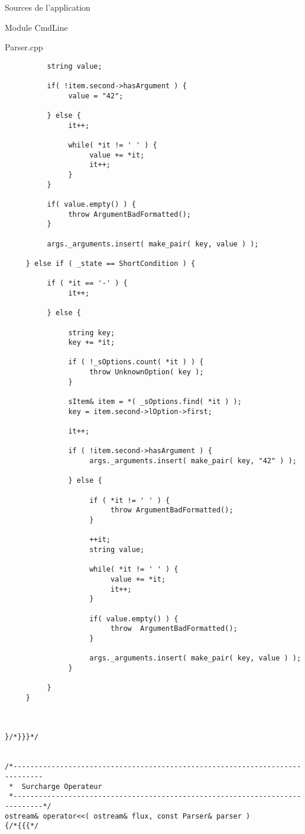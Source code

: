 \documentclass{article}
\begin{document}
\begin{section}{Sources de l'application}
\begin{subsection}{Module CmdLine}
\begin{paragraph}{Parser.cpp}
\begin{verbatim}
          string value;

          if( !item.second->hasArgument ) {
               value = "42";

          } else {
               it++;

               while( *it != ' ' ) {
                    value += *it;
                    it++;
               }
          }

          if( value.empty() ) {
               throw ArgumentBadFormatted();
          }

          args._arguments.insert( make_pair( key, value ) );

     } else if ( _state == ShortCondition ) {

          if ( *it == '-' ) {
               it++;

          } else {

               string key;
               key += *it;

               if ( !_sOptions.count( *it ) ) {
                    throw UnknownOption( key );
               }

               sItem& item = *( _sOptions.find( *it ) );
               key = item.second->lOption->first;

               it++;

               if ( !item.second->hasArgument ) {
                    args._arguments.insert( make_pair( key, "42" ) );

               } else {

                    if ( *it != ' ' ) {
                         throw ArgumentBadFormatted();
                    }

                    ++it;
                    string value;

                    while( *it != ' ' ) {
                         value += *it;
                         it++;
                    }

                    if( value.empty() ) {
                         throw  ArgumentBadFormatted();
                    }

                    args._arguments.insert( make_pair( key, value ) );
               }

          }
     }



}/*}}}*/


/*-----------------------------------------------------------------------------
 *  Surcharge Operateur
 *-----------------------------------------------------------------------------*/
ostream& operator<<( ostream& flux, const Parser& parser )
{/*{{{*/


\end{verbatim}
\end{paragraph}
\end{subsection}
\end{section}
\end{document}
